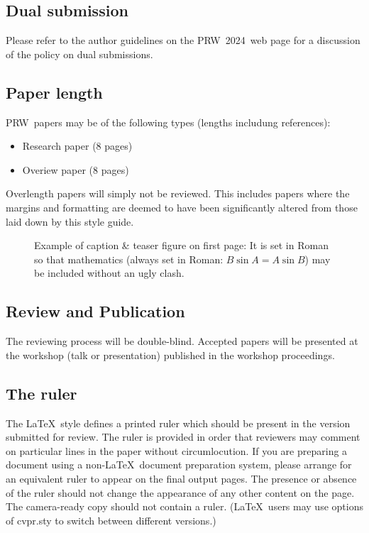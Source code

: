 \documentclass[10pt,twocolumn,letterpaper]{article}
\def\confName{PRW}
\def\confYear{2024}
\begin{document}
\subsection{Dual submission}

Please refer to the author guidelines on the \confName\ \confYear\ web page for a
discussion of the policy on dual submissions.


\subsection{Paper length} 

\confName\  papers may be of the following types (lengths includung references):

\begin{itemize}

\item Research paper (8 pages)
\item Overiew paper (8 pages)
\end{itemize}

Overlength papers will simply not be reviewed. This includes papers where the 
margins and formatting are deemed to have been significantly altered from those 
laid down by this style guide. 


\begin{figure}[t]
  \centering
  \fbox{\rule{0pt}{1.8in} \rule{0.7\linewidth}{0pt}}

   \caption{Example of caption \& teaser figure on first page: It is set in 
   Roman so that mathematics (always set in Roman: $B \sin A = A \sin B$) may
   be included without an ugly clash.}
   \label{fig:onecol}
\end{figure}


\subsection{Review and Publication}

The reviewing process will be double-blind. Accepted papers will be presented at the workshop (talk or presentation) published in the workshop proceedings. 


\subsection{The ruler}
The \LaTeX\ style defines a printed ruler which should be present in the version submitted for review. The ruler is provided in order that reviewers may comment on particular lines in the paper without circumlocution. If you are preparing a document using a non-\LaTeX\ document preparation system, please arrange for an equivalent ruler to appear on the final output pages. The presence or absence of the ruler should not change the appearance of any other content on the page. The camera-ready copy should not contain a ruler. (\LaTeX\ users may use options of cvpr.sty to switch between different versions.)
\end{document}
